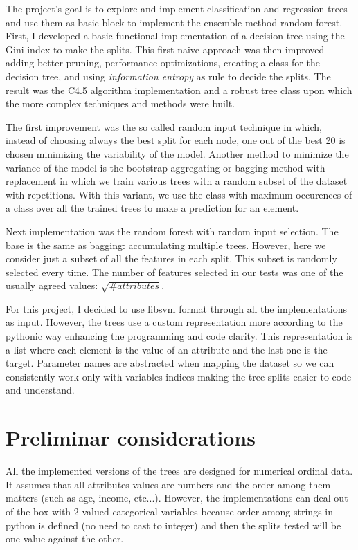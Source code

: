\documentclass[a4paper,10pt]{article}
\begin{document}
The project's goal is to explore and implement classification and regression trees and use them as basic block to implement the ensemble method random forest. First, I developed a basic functional implementation of a decision tree using the Gini index to make the splits. This first naive approach was then improved adding better pruning, performance optimizations, creating a class for the decision tree, and using \textit{information entropy} as rule to decide the splits. The result was the C4.5 \cite{Quinlan1993} algorithm implementation and a robust tree class upon which the more complex techniques and methods were built. 

The first improvement was the so called random input technique in which, instead of choosing always the best split for each node, one out of the best 20 is chosen minimizing the variability of the model. Another method to minimize the variance of the model is the bootstrap aggregating or bagging method with replacement \cite{Breiman2001} in which we train various trees with a random subset of the dataset with repetitions. With this variant, we use the class with maximum occurences of a class over all the trained trees to make a prediction for an element. 

Next implementation was the random forest with random input selection. The base is the same as bagging: accumulating multiple trees. However, here we consider just a subset of all the features in each split. This subset is randomly selected every time. The number of features selected in our tests was one of the usually agreed values: $\sqrt{\# attributes}$.

For this project, I decided to use libsvm format through all the implementations as input. However, the trees use a custom representation more according to the pythonic way enhancing the programming and code clarity. This representation is a list where each element is the value of an attribute and the last one is the target. Parameter names are abstracted when mapping the dataset so we can consistently work only with variables indices making the tree splits easier to code and understand.

\section{Preliminar considerations}

All the implemented versions of the trees are designed for numerical ordinal data. It assumes that all attributes values are numbers and the order among them matters (such as age, income, etc...). However, the implementations can deal out-of-the-box with 2-valued categorical variables because order among strings in python is defined (no need to cast to integer) and then the splits tested will be one value against the other. 
\end{document}
